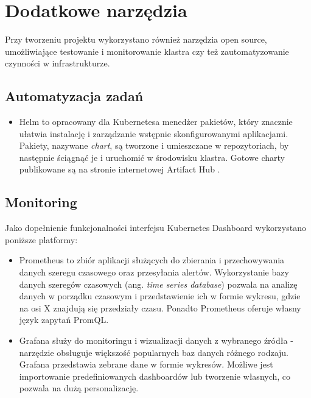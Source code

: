 

\chapter{Dodatkowe narzędzia}

Przy tworzeniu projektu wykorzystano również narzędzia open source, umożliwiające testowanie i monitorowanie klastra czy też zautomatyzowanie czynności w infrastrukturze.

\section{Automatyzacja zadań}

\begin{itemize}
    \item Helm \cite{helm} to opracowany dla Kubernetesa menedżer pakietów, który znacznie ułatwia instalację i zarządzanie wstępnie skonfigurowanymi aplikacjami. Pakiety, nazywane \textit{chart}, są tworzone i umieszczane w repozytoriach, by następnie ściągnąć je i uruchomić w środowisku klastra. Gotowe charty publikowane są na stronie internetowej Artifact Hub \cite{artifacthub}.

\end{itemize}

\section{Monitoring}

Jako dopełnienie funkcjonalności interfejsu Kubernetes Dashboard wykorzystano poniższe platformy:

\begin{itemize}
    \item Prometheus \cite{prometheus} to zbiór aplikacji służących do zbierania i przechowywania danych szeregu czasowego oraz przesyłania alertów. Wykorzystanie bazy danych szeregów czasowych (ang. \textit{time series database}) pozwala na analizę danych w porządku czasowym i przedstawienie ich w formie wykresu, gdzie na osi X znajdują się przedziały czasu. Ponadto Prometheus oferuje własny język zapytań PromQL.

    \item Grafana \cite{grafana} służy do monitoringu i wizualizacji danych z wybranego źródła - narzędzie obsługuje większość popularnych baz danych różnego rodzaju. Grafana przedstawia zebrane dane w formie wykresów. Możliwe jest importowanie predefiniowanych dashboardów lub tworzenie własnych, co pozwala na dużą personalizację. 
\end{itemize}

